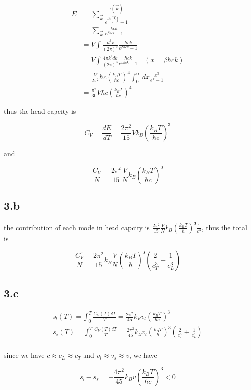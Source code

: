 \documentclass{article}
\begin{document}
$$
\begin{aligned}
    E &= \sum_{\vec{k}} \frac{\epsilon(\vec{k})}{e^{\beta \epsilon(\vec{k})} - 1}\\
    &= \sum_{\vec{k}} \frac{\hbar ck}{e^{\beta \hbar ck} - 1}\\
    &= V\int \frac{d^3k}{(2\pi)^3} \frac{\hbar ck}{e^{\beta \hbar ck} - 1}\\
    &= V\int \frac{4\pi k^2 dk}{(2\pi)^3} \frac{\hbar ck}{e^{\beta \hbar ck} - 1}\quad (x =\beta \hbar c k)\\
    &= \frac{V}{2\pi^2} \hbar c (\frac{k_B T}{\hbar c})^4 \int_0^{\infty} dx \frac{x^3}{e^x - 1}\\
    &= \frac{\pi^2}{30} V \hbar c (\frac{k_B T}{\hbar c})^4
\end{aligned}
$$

thus the head capcity is

$$
C_V = \frac{dE}{dT} = \frac{2\pi^2}{15} V k_B (\frac{k_B T}{\hbar c})^3
$$

and

$$
\frac{C_V}{N} = \frac{2\pi^2}{15} \frac{V}{N} k_B (\frac{k_B T}{\hbar c})^3
$$

\subsection*{3.b}
the contribution of each mode in head capcity is $\frac{2\pi^2}{15} \frac{V}{N} k_B (\frac{k_B T}{\hbar})^3 \frac{1}{c^3}$, thus
the total is

$$
\frac{C_V^s}{N} = \frac{2\pi^2}{15} k_B \frac{V}{N} (\frac{k_B T}{\hbar})^3 (\frac{2}{c^3_T} + \frac{1}{c^3_L})
$$

\subsection*{3.c}

$$
\begin{aligned}
    s_{l}(T) = \int_0^T \frac{C_V(T)dT}{T} = \frac{2\pi^2}{45} k_B v_l (\frac{k_B T}{\hbar c})^3\\
    s_{s}(T) = \int_0^T \frac{C_V(T)dT}{T} = \frac{2\pi^2}{45} k_B v_l (\frac{k_B T}{\hbar})^3 (\frac{2}{c_T^3} + \frac{1}{c_L^3})\\
\end{aligned}
$$

since we have $c\approx c_L \approx c_T$ and $v_l \approx v_s \approx v$, we have

$$
s_l - s_s = -\frac{4\pi^2}{45} k_B v (\frac{k_B T}{\hbar c})^3 < 0
$$
\end{document}
